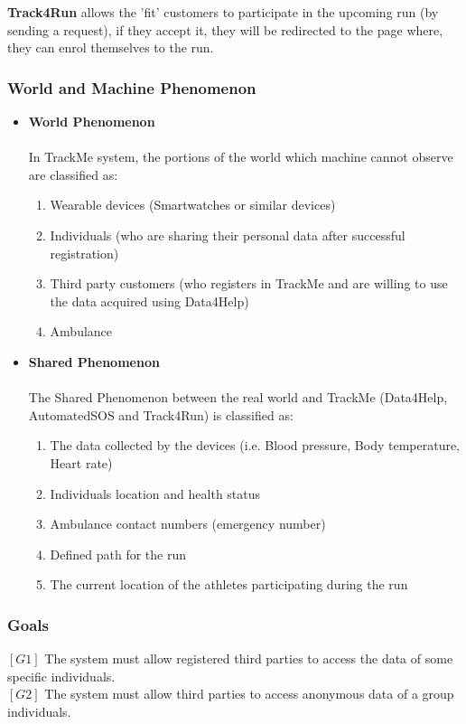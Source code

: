 \documentclass[12pt]{article}
\begin{document}
\textbf{Track4Run} allows the 'fit' customers to participate in the upcoming run (by sending a request), if they accept it, they will be redirected to the page where, they can enrol themselves to the run.\\

\subsubsection{World and Machine Phenomenon}
\begin{itemize}
\item \textbf{World Phenomenon}
\\
\\
In TrackMe system, the portions of the world which machine cannot observe are classified as:
\begin{enumerate}
\item{} Wearable devices (Smartwatches or similar devices)
\item{} Individuals (who are sharing their personal data after successful registration)
\item{} Third party customers (who registers in TrackMe and are willing to use the data acquired using Data4Help)
\item{} Ambulance 
\end{enumerate}

\item \textbf{Shared Phenomenon}
\\
\\
The Shared Phenomenon between the real world and TrackMe (Data4Help, AutomatedSOS and Track4Run) is classified as:
\begin{enumerate}
\item{} The data collected by the devices (i.e. Blood pressure, Body temperature, Heart rate)
\item{} Individuals location and health status
\item{} Ambulance contact numbers (emergency number)
\item{} Defined path for the run
\item{} The current location of the athletes participating during the run
\end{enumerate}
\end{itemize}

\subsubsection{Goals}
$[ G1 ]$ The system must allow registered third parties to access the data of some specific individuals.\\
$[ G2 ]$ The system must allow third parties to access anonymous data of a group individuals.
\end{document}
